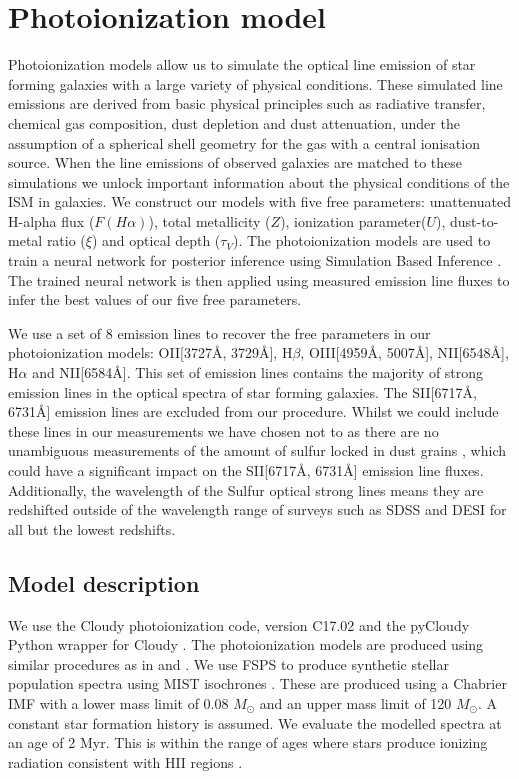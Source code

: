 \documentclass[fleqn,usenatbib]{mnras}
\begin{document}
\section{Photoionization model}
\label{sec:photoionization_model}
Photoionization models allow us to simulate the optical line emission of star forming galaxies with a large variety of physical conditions. These simulated line emissions are derived from basic physical principles such as radiative transfer, chemical gas composition, dust depletion and dust attenuation, under the assumption of a spherical shell geometry for the gas with a central ionisation source. When the line emissions of observed galaxies are matched to these simulations we unlock important information about the physical conditions of the ISM in galaxies. We construct our models with five free parameters: unattenuated H-alpha flux ($F(H\alpha)$), total metallicity ($Z$), ionization parameter($U$), dust-to-metal ratio ($\xi$) and optical depth ($\tau_V$). The photoionization models are used to train a neural network for posterior inference using Simulation Based Inference \citep{tejero-cantero2020}. The trained neural network is then applied using measured emission line fluxes to infer the best values of our five free parameters.

We use a set of 8 emission lines to recover the free parameters in our photoionization models: OII[3727\AA, 3729\AA], H$\beta$, OIII[4959\AA, 5007\AA], NII[6548\AA], H$\alpha$ and NII[6584\AA]. This set of emission lines contains the majority of strong emission lines in the optical spectra of star forming galaxies. The SII[6717\AA, 6731\AA] emission lines are excluded from our procedure. Whilst we could include these lines in our measurements we have chosen not to as there are no unambiguous measurements of the amount of sulfur locked in dust grains \citep{jenkins2009}, which could have a significant impact on the SII[6717\AA, 6731\AA] emission line fluxes. Additionally, the wavelength of the Sulfur optical strong lines means they are redshifted outside of the wavelength range of surveys such as SDSS and DESI for all but the lowest redshifts. 

\subsection{Model description}
We use the Cloudy photoionization code, version C17.02 \citep{ferland2017} and the pyCloudy Python wrapper for Cloudy \citep{morisset2013}.  The photoionization models are produced using similar procedures as in \cite{charlot2001, brinchmann2013} and \cite{byler2017}. We use FSPS to produce synthetic stellar population spectra \citep{conroy2009,conroy2010} using MIST isochrones \citep{choi2016}. These are produced using a Chabrier IMF \cite{chabrier2003} with a lower mass limit of 0.08 $M_\odot$ and an upper mass limit of 120 $M_\odot$. A constant star formation history is assumed. We evaluate the modelled spectra at an age of 2 Myr. This is within the range of ages where stars produce ionizing radiation consistent with HII regions \citep{byler2017}.
\end{document}
